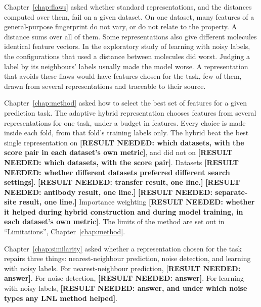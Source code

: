 Chapter~\ref{chap:flaws} asked whether standard representations, and the distances computed over them, fail on a given dataset. On one dataset, many features of a general-purpose fingerprint do not vary, or do not relate to the property. A distance sums over all of them. Some representations also give different molecules identical feature vectors. In the exploratory study of learning with noisy labels, the configurations that used a distance between molecules did worst. Judging a label by its neighbours' labels usually made the model worse. A representation that avoids these flaws would have features chosen for the task, few of them, drawn from several representations and traceable to their source.

Chapter~\ref{chap:method} asked how to select the best set of features for a given prediction task. The adaptive hybrid representation chooses features from several representations for one task, under a budget in features. Every choice is made inside each fold, from that fold's training labels only. The hybrid beat the best single representation on \textbf{[RESULT NEEDED: which datasets, with the score pair in each dataset's own metric]}, and did not on \textbf{[RESULT NEEDED: which datasets, with the score pair]}. Datasets \textbf{[RESULT NEEDED: whether different datasets preferred different search settings]}. \textbf{[RESULT NEEDED: transfer result, one line.]} \textbf{[RESULT NEEDED: antibody result, one line.]} \textbf{[RESULT NEEDED: separate-site result, one line.]} Importance weighting \textbf{[RESULT NEEDED: whether it helped during hybrid construction and during model training, in each dataset's own metric]}. The limits of the method are set out in ``Limitations'', Chapter~\ref{chap:method}.

Chapter~\ref{chap:similarity} asked whether a representation chosen for the task repairs three things: nearest-neighbour prediction, noise detection, and learning with noisy labels. For nearest-neighbour prediction, \textbf{[RESULT NEEDED: answer]}. For noise detection, \textbf{[RESULT NEEDED: answer]}. For learning with noisy labels, \textbf{[RESULT NEEDED: answer, and under which noise types any LNL method helped]}.

